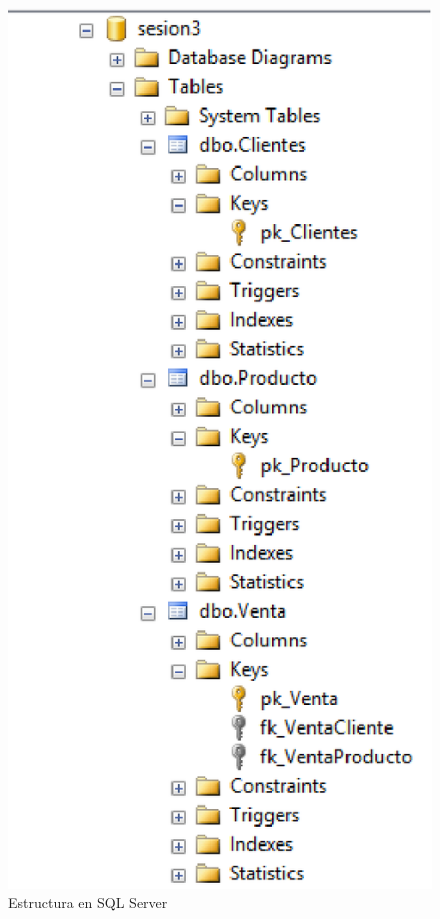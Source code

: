 \documentclass[a4paper,12pt]{article}
\begin{document}
\begin{figure}[h]
\centering
\includegraphics[scale=0.5]{1.eps}
\caption{Estructura en SQL Server}
\end{figure}
\end{document}
